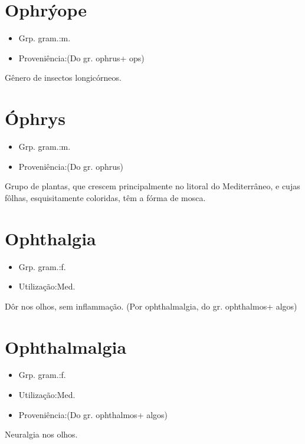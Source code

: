 \section{Ophrýope}
\begin{itemize}
\item {Grp. gram.:m.}
\end{itemize}
\begin{itemize}
\item {Proveniência:(Do gr. \textunderscore ophrus\textunderscore  + \textunderscore ops\textunderscore )}
\end{itemize}
Gênero de insectos longicórneos.
\section{Óphrys}
\begin{itemize}
\item {Grp. gram.:m.}
\end{itemize}
\begin{itemize}
\item {Proveniência:(Do gr. \textunderscore ophrus\textunderscore )}
\end{itemize}
Grupo de plantas, que crescem principalmente no litoral do Mediterrâneo, e cujas fôlhas, esquisitamente coloridas, têm a fórma de mosca.
\section{Ophthalgia}
\begin{itemize}
\item {Grp. gram.:f.}
\end{itemize}
\begin{itemize}
\item {Utilização:Med.}
\end{itemize}
Dôr nos olhos, sem inflammação.
(Por \textunderscore ophthalmalgia\textunderscore , do gr. \textunderscore ophthalmos\textunderscore  + \textunderscore algos\textunderscore )
\section{Ophthalmalgia}
\begin{itemize}
\item {Grp. gram.:f.}
\end{itemize}
\begin{itemize}
\item {Utilização:Med.}
\end{itemize}
\begin{itemize}
\item {Proveniência:(Do gr. \textunderscore ophthalmos\textunderscore  + \textunderscore algos\textunderscore )}
\end{itemize}
Neuralgia nos olhos.
